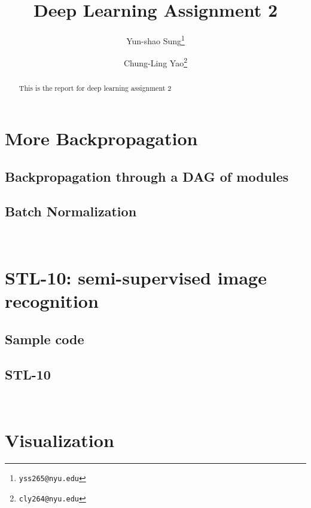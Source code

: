 \documentclass[final]{siamltexmm}
\title{Deep Learning Assignment 2}
\author{Yun-shao Sung\thanks{\tt yss265@nyu.edu}
        \and Chung-Ling Yao\thanks{\tt cly264@nyu.edu}}
\begin{document}
\maketitle

\begin{abstract}
This is the report for deep learning assignment 2
\end{abstract}

\pagestyle{myheadings}
\thispagestyle{plain}

\section{More Backpropagation}
\subsection{Backpropagation through a DAG of modules}
\subsection{Batch Normalization}

\\
\section{STL-10: semi-supervised image recognition}
\subsection{Sample code}
\subsection{STL-10}


\\
\section{Visualization}
\end{document}
